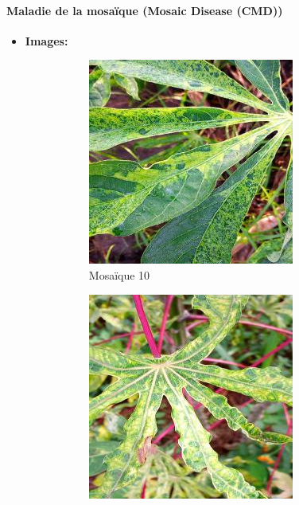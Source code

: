 \documentclass{article}
\begin{document}
		
		\paragraph{Maladie de la mosaïque (Mosaic Disease (CMD))}
		\begin{itemize}
			\item \textbf{Images: }
			\begin{figure}[htbp]
				\centering
				\begin{subfigure}[b]{0.3\textwidth}
					\centering
					\includegraphics[width=\textwidth]{img/10.jpg}
					\caption{Mosaïque 10}
				\end{subfigure}
				\hfill
				\begin{subfigure}[b]{0.3\textwidth}
					\centering
					\includegraphics[width=\textwidth]{img/11.jpg}

\end{subfigure}
\end{figure}
\end{itemize}
\end{document}
